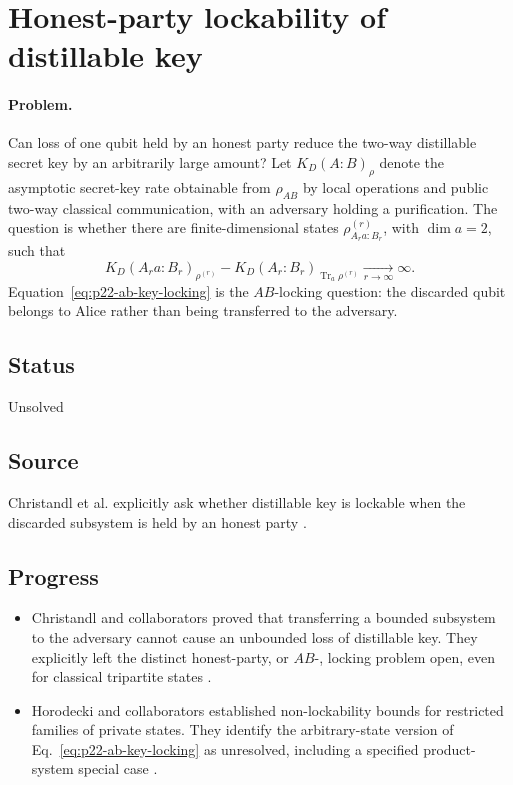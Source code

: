\section{Honest-party lockability of distillable key}
\label{sec:problem-22}

\paragraph{Problem.}
Can loss of one qubit held by an honest party reduce the two-way distillable
secret key by an arbitrarily large amount?  Let $K_D(A:B)_\rho$ denote the
asymptotic secret-key rate obtainable from $\rho_{AB}$ by local operations and
public two-way classical communication, with an adversary holding a
purification.  The question is whether there are finite-dimensional states
$\rho^{(r)}_{A_ra:B_r}$, with $\dim a=2$, such that
\begin{equation}
  K_D(A_ra:B_r)_{\rho^{(r)}}
  -K_D(A_r:B_r)_{\operatorname{Tr}_a\rho^{(r)}}
  \xrightarrow[r\to\infty]{}\infty.
  \label{eq:p22-ab-key-locking}
\end{equation}
Equation~\eqref{eq:p22-ab-key-locking} is the $AB$-locking question: the
discarded qubit belongs to Alice rather than being transferred to the
adversary.

\subsection*{Status}

Unsolved

\subsection*{Source}

Christandl et al. explicitly ask whether distillable key is lockable when the
discarded subsystem is held by an honest party
.

\subsection*{Progress}

\begin{itemize}
  \item Christandl and collaborators proved that transferring a bounded
  subsystem to the adversary cannot cause an unbounded loss of distillable
  key.  They explicitly left the distinct honest-party, or $AB$-, locking
  problem open, even for classical tripartite states
  .

  \item Horodecki and collaborators established non-lockability bounds for
  restricted families of private states.  They identify the arbitrary-state
  version of Eq.~\eqref{eq:p22-ab-key-locking} as unresolved, including a
  specified product-system special case
  .
\end{itemize}


